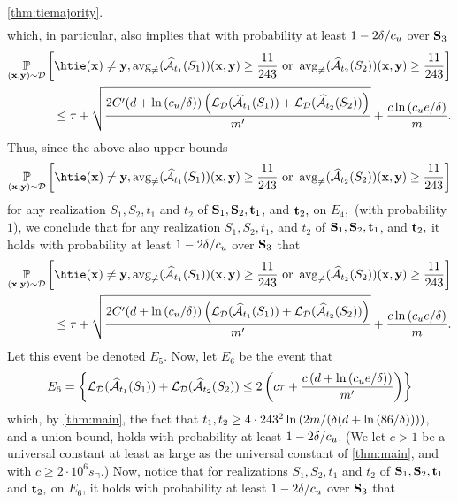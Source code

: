 \begin{proofof}{\cref{thm:tiemajority}.}
\begin{align*}
\end{align*}
which, in particular, also implies that with probability at least $ 1-2\delta/c_{u} $ over $ \mathbf{S}_{3} $ 
\begin{align*}
    \p_{(\rx,\ry)\sim\cD}\left[ \htie(\rx)\not=\ry,\avg(\widehat{\cA}_{t_{1}}(S_{1}))(\rx,\ry)\geq \frac{11}{243} \text{ or } \avg(\widehat{\cA}_{t_{2}}(S_{2}))(\rx,\ry)\geq \frac{11}{243}\right]
    \\
    \leq \tau+ \sqrt{\frac{2C'(d+\ln{\left(\cu/\delta \right)})\left(\ls_{\cD}(\widehat{\cA}_{t_{1}}(S_{1})) +\ls_{\cD}(\widehat{\cA}_{t_{2}}(S_{2}))\right)}{m'}}+\frac{c\ln{\left(\cu e/\delta \right)}}{m}.
\end{align*}
Thus, since the above also upper bounds 
\[ \p_{(\rx,\ry)\sim\cD}\left[ \htie(\rx)\not=\ry,\avg(\widehat{\cA}_{t_{1}}(S_{1}))(\rx,\ry)\geq \frac{11}{243} \text{ or } \avg(\widehat{\cA}_{t_{2}}(S_{2}))(\rx,\ry)\geq \frac{11}{243}\right] \]
for any realization $ S_{1},S_{2},t_{1} $ and $ t_{2} $ of $ \mathbf{S}_{1},\mathbf{S}_{2},\mathbf{t}_{1} $, and $ \mathbf{t}_{2},$ on $ E_{4},$ (with probability $ 1 $), we conclude that for any realization  $S_{1},S_{2},t_{1} $, and $ t_{2} $ of $ \mathbf{S}_{1},\mathbf{S}_{2},\mathbf{t}_{1} $, and $ \mathbf{t}_{2},$ it holds with probability at least $ 1-2\delta/c_{u} $ over $ \mathbf{S}_{3} $ that 
\begin{align*}
    \p_{(\rx,\ry)\sim\cD}\left[ \htie(\rx)\not=\ry,\avg(\widehat{\cA}_{t_{1}}(S_{1}))(\rx,\ry)\geq \frac{11}{243} \text{ or } \avg(\widehat{\cA}_{t_{2}}(S_{2}))(\rx,\ry)\geq \frac{11}{243}\right]
    \\
    \leq \tau+ \sqrt{\frac{2C'(d+\ln{\left(\cu/\delta \right)})\left(\ls_{\cD}(\widehat{\cA}_{t_{1}}(S_{1})) +\ls_{\cD}(\widehat{\cA}_{t_{2}}(S_{2}))\right)}{m'}}+\frac{c\ln{\left(\cu e/\delta \right)}}{m}.
\end{align*}
Let this event be denoted $ E_{5} $. 
Now, let $ E_{6} $ be the event that
\begin{align*}
 E_{6}= \left \{ \operatorname{\mathcal{L}}_{\mathcal{D}}(\widehat{\mathcal{A}}_{t_{1}}(S_{1})) +\operatorname{\mathcal{L}}_{\mathcal{D}}(\widehat{\mathcal{A}}_{t_{2}}(S_{2})) \leq 2 \left(c\tau+\frac{c\left(d+\ln{(c_{u}e/\delta )}\right)}{m'} \right) \right\} 
\end{align*} 
which, by \cref{thm:main}, the fact that $ t_{1},t_{2}\geq 4\cdot243^{2}\ln{\left(2m/(\delta(d+\ln{\left(86/\delta \right)})) \right)} $, and a union bound, holds with probability at least $ 1-2\delta/c_{u} $. (We let $ c>1 $ be a universal constant at least as large as the universal constant of \cref{thm:main}, and with $ c\geq 2\cdot10^{6}s_{\sqcap} $.) 
Now, notice that for realizations $S_{1},S_{2},t_{1} $ and $ t_{2} $ of $ \mathbf{S}_{1},\mathbf{S}_{2},\mathbf{t}_{1} $ and $ \mathbf{t}_{2},$ on $ E_{6} $,  it holds with probability at least $ 1-2\delta/c_{u} $ over $ \mathbf{S}_{3} $ that 

\end{proofof}
